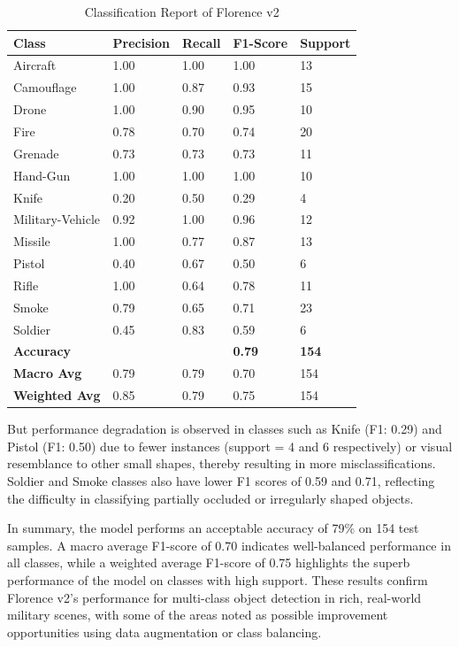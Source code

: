 \documentclass[fleqn,10pt,lineno]{wlpeerj}
\begin{document}
\begin{table}[H]
\centering
\caption{Classification Report of Florence v2}
\renewcommand{\arraystretch}{1.2}
\begin{tabular}{|p{2cm}|p{2cm}|p{2cm}|p{2cm}|p{2cm}|}
\hline
\textbf{Class} & \textbf{Precision} & \textbf{Recall} & \textbf{F1-Score} & \textbf{Support} \\
\hline
Aircraft           & 1.00 & 1.00 & 1.00 & 13  \\
Camouflage         & 1.00 & 0.87 & 0.93 & 15  \\
Drone              & 1.00 & 0.90 & 0.95 & 10  \\
Fire               & 0.78 & 0.70 & 0.74 & 20  \\
Grenade            & 0.73 & 0.73 & 0.73 & 11  \\
Hand-Gun           & 1.00 & 1.00 & 1.00 & 10  \\
Knife              & 0.20 & 0.50 & 0.29 & 4   \\
Military-Vehicle   & 0.92 & 1.00 & 0.96 & 12  \\
Missile            & 1.00 & 0.77 & 0.87 & 13  \\
Pistol             & 0.40 & 0.67 & 0.50 & 6   \\
Rifle              & 1.00 & 0.64 & 0.78 & 11  \\
Smoke              & 0.79 & 0.65 & 0.71 & 23  \\
Soldier            & 0.45 & 0.83 & 0.59 & 6   \\
\hline
\textbf{Accuracy}      &       &       & \textbf{0.79} & \textbf{154} \\
\textbf{Macro Avg}     & 0.79  & 0.79  & 0.70          & 154 \\
\textbf{Weighted Avg}  & 0.85  & 0.79  & 0.75          & 154 \\
\hline
\end{tabular}
\label{tab:florence_classification}
\end{table}

But performance degradation is observed in classes such as Knife (F1: 0.29) and Pistol (F1: 0.50) due to fewer instances (support = 4 and 6 respectively) or visual resemblance to other small shapes, thereby resulting in more misclassifications. Soldier and Smoke classes also have lower F1 scores of 0.59 and 0.71, reflecting the difficulty in classifying partially occluded or irregularly shaped objects.
 
In summary, the model performs an acceptable accuracy of 79\% on 154 test samples. A macro average F1-score of 0.70 indicates well-balanced performance in all classes, while a weighted average F1-score of 0.75 highlights the superb performance of the model on classes with high support. These results confirm Florence v2's performance for multi-class object detection in rich, real-world military scenes, with some of the areas noted as possible improvement opportunities using data augmentation or class balancing.
\end{document}
